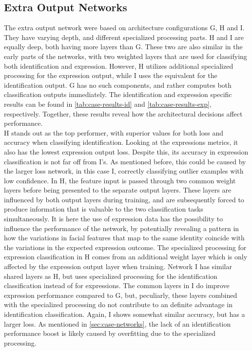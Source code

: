 \subsection{Extra Output Networks}

The extra output network were based on architecture configurations G, H and I. They have varying depth, and different specialized processing parts. H and I are equally deep, both having more layers than G. These two are also similar in the early parts of the networks, with two weighted layers that are used for classifying both identification and expression. However, H utilizes additional specialized processing for the expression output, while I uses the equivalent for the identification output. G has no such components, and rather computes both classification outputs immediately. The identification and expression specific results can be found in \autoref{tab:case-results-id} and \autoref{tab:case-results-exp}, respectively. Together, these results reveal how the architectural decisions affect performance. \\

\noindent H stands out as the top performer, with superior values for both loss and accuracy when classifying identification. Looking at the expressions metrics, it also has the lowest expression output loss. Despite this, its accuracy in expression classification is not far off from I's. As mentioned before, this could be caused by the larger loss network, in this case I, correctly classifying outlier examples with low confidence. In H, the feature input is passed through two common weight layers before being presented to the separate output layers. These layers are influenced by both output layers during training, and are subsequently forced to produce information that is valuable to the two classification tasks simultaneously. It is here the use of expression data has the possibility to influence the performance of the network, by potentially revealing a pattern in how the variations in facial features that map to the same identity coincide with the variations in the expected expression outcome. The specialized processing for expression classification in H comes from an additional weight layer which is only affected by the expression output layer when training. Network I has similar shared layers as H, but uses specialized processing for the identification classification instead of for expressions. The common layers in I do improve expression performance compared to G, but, peculiarly, these layers combined with the specialized processing do not contribute to an definite advantage in identification classification. Again, I shows somewhat similar accuracy, but has a larger loss. As mentioned in \autoref{sec:case-networks}, the lack of an identification performance boost is likely caused by overfitting due to the specialized processing. 

